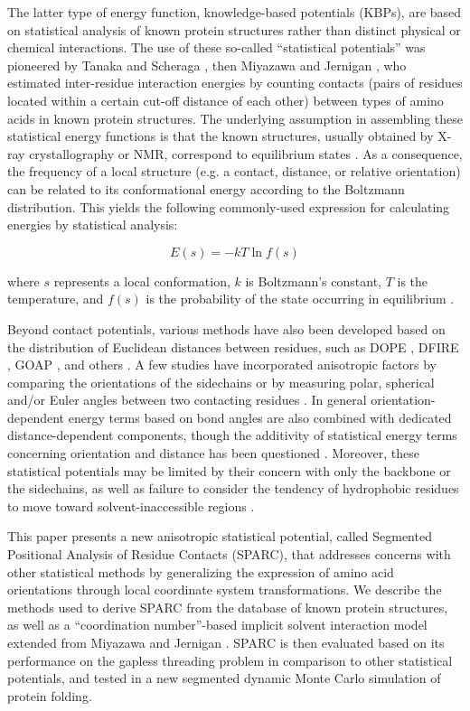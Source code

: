 \documentclass[11pt,twocolumn]{article}
\begin{document}
The latter type of energy function, knowledge-based potentials (KBPs), are based on statistical analysis of known protein structures rather than distinct physical or chemical interactions. 
The use of these so-called ``statistical potentials'' was pioneered by Tanaka and Scheraga \cite{tanaka}, then Miyazawa and Jernigan \cite{miyazawa}, who estimated inter-residue interaction energies by counting contacts (pairs of residues located within a certain cut-off distance of each other) between types of amino acids in known protein structures.
The underlying assumption in assembling these statistical energy functions is that the known structures, usually obtained by X-ray crystallography or NMR, correspond to equilibrium states \cite{buchete2003}. 
As a consequence, the frequency of a local structure (e.g. a contact, distance, or relative orientation) can be related to its conformational energy according to the Boltzmann distribution.
This yields the following commonly-used expression for calculating energies by statistical analysis:

\begin{equation}
E(s) = -kT\ln{f(s)}
\label{boltzmann_device}
\end{equation}

where $s$ represents a local conformation, $k$ is Boltzmann's constant, $T$ is the temperature, and $f(s)$ is the probability of the state occurring in equilibrium \cite{sippl}.

Beyond contact potentials, various methods have also been developed based on the distribution of Euclidean distances between residues, such as DOPE \cite{shen}, DFIRE \cite{zhou}, GOAP \cite{zhou2}, and others \cite{lu,zhang}.
A few studies have incorporated anisotropic factors by comparing the orientations of the sidechains \cite{zhang3,mukherjee} or by measuring polar, spherical and/or Euler angles between two contacting residues \cite{miyazawa2,buchete2003}. 
In general orientation-dependent energy terms based on bond angles are also combined with dedicated distance-dependent components, though the additivity of statistical energy terms concerning orientation and distance has been questioned \cite{shen}.
Moreover, these statistical potentials may be limited by their concern with only the backbone or the sidechains, as well as failure to consider the tendency of hydrophobic residues to move toward solvent-inaccessible regions \cite{mullinax}.

This paper presents a new anisotropic statistical potential, called Segmented Positional Analysis of Residue Contacts (SPARC), that addresses concerns with other statistical methods by generalizing the expression of amino acid orientations through local coordinate system transformations.
We describe the methods used to derive SPARC from the database of known protein structures, as well as a ``coordination number''-based implicit solvent interaction model extended from Miyazawa and Jernigan \cite{miyazawa}.
SPARC is then evaluated based on its performance on the gapless threading problem in comparison to other statistical potentials, and tested in a new segmented dynamic Monte Carlo simulation of protein folding.
\end{document}
